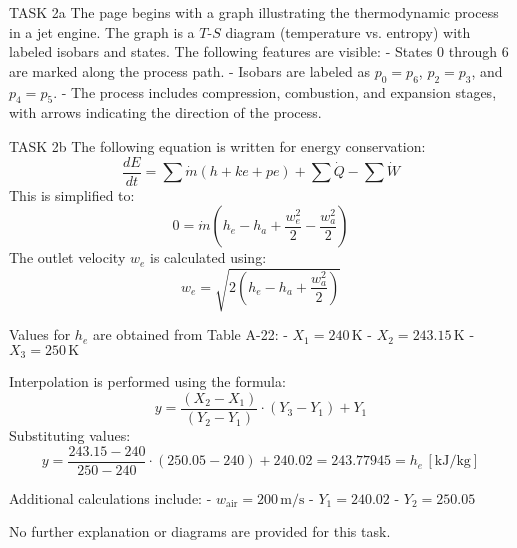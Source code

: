 TASK 2a  
The page begins with a graph illustrating the thermodynamic process in a jet engine. The graph is a \( T \)-\( S \) diagram (temperature vs. entropy) with labeled isobars and states. The following features are visible:  
- States 0 through 6 are marked along the process path.  
- Isobars are labeled as \( p_0 = p_6 \), \( p_2 = p_3 \), and \( p_4 = p_5 \).  
- The process includes compression, combustion, and expansion stages, with arrows indicating the direction of the process.  

TASK 2b  
The following equation is written for energy conservation:  
\[
\frac{dE}{dt} = \sum \dot{m} \left( h + ke + pe \right) + \sum \dot{Q} - \sum \dot{W}
\]  
This is simplified to:  
\[
0 = \dot{m} \left( h_e - h_a + \frac{w_e^2}{2} - \frac{w_a^2}{2} \right)
\]  
The outlet velocity \( w_e \) is calculated using:  
\[
w_e = \sqrt{2 \left( h_e - h_a + \frac{w_a^2}{2} \right)}
\]  

Values for \( h_e \) are obtained from Table A-22:  
- \( X_1 = 240 \, \text{K} \)  
- \( X_2 = 243.15 \, \text{K} \)  
- \( X_3 = 250 \, \text{K} \)  

Interpolation is performed using the formula:  
\[
y = \frac{(X_2 - X_1)}{(Y_2 - Y_1)} \cdot (Y_3 - Y_1) + Y_1
\]  
Substituting values:  
\[
y = \frac{243.15 - 240}{250 - 240} \cdot (250.05 - 240) + 240.02 = 243.77945 = h_e \, [\text{kJ/kg}]
\]  

Additional calculations include:  
- \( w_{\text{air}} = 200 \, \text{m/s} \)  
- \( Y_1 = 240.02 \)  
- \( Y_2 = 250.05 \)  

No further explanation or diagrams are provided for this task.